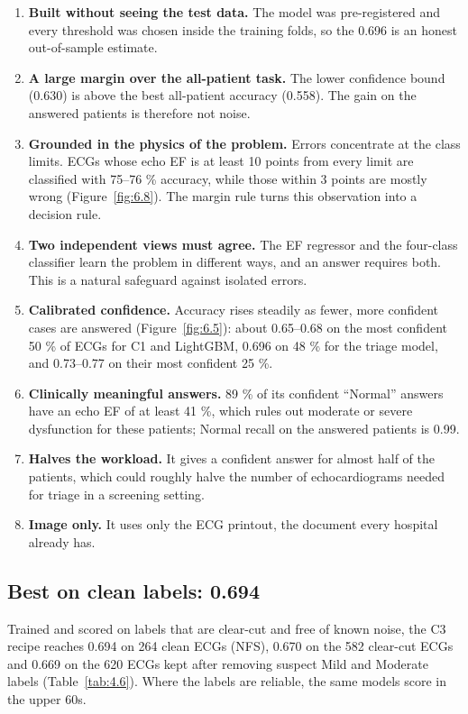 \begin{enumerate}
  \item \textbf{Built without seeing the test data.} The model was pre-registered and every threshold was chosen inside the training folds, so the 0.696 is an honest out-of-sample estimate.
  \item \textbf{A large margin over the all-patient task.} The lower confidence bound (0.630) is above the best all-patient accuracy (0.558). The gain on the answered patients is therefore not noise.
  \item \textbf{Grounded in the physics of the problem.} Errors concentrate at the class limits. ECGs whose echo EF is at least 10 points from every limit are classified with 75--76 \% accuracy, while those within 3 points are mostly wrong (Figure~\ref{fig:6.8}). The margin rule turns this observation into a decision rule.
  \item \textbf{Two independent views must agree.} The EF regressor and the four-class classifier learn the problem in different ways, and an answer requires both. This is a natural safeguard against isolated errors.
  \item \textbf{Calibrated confidence.} Accuracy rises steadily as fewer, more confident cases are answered (Figure~\ref{fig:6.5}): about 0.65--0.68 on the most confident 50 \% of ECGs for C1 and LightGBM, 0.696 on 48 \% for the triage model, and 0.73--0.77 on their most confident 25 \%.
  \item \textbf{Clinically meaningful answers.} 89 \% of its confident ``Normal'' answers have an echo EF of at least 41 \%, which rules out moderate or severe dysfunction for these patients; Normal recall on the answered patients is 0.99.
  \item \textbf{Halves the workload.} It gives a confident answer for almost half of the patients, which could roughly halve the number of echocardiograms needed for triage in a screening setting.
  \item \textbf{Image only.} It uses only the ECG printout, the document every hospital already has.
\end{enumerate}

\subsection{Best on clean labels: 0.694}\label{sec:6.1.4}

Trained and scored on labels that are clear-cut and free of known noise, the C3 recipe reaches 0.694 on 264 clean ECGs (NFS), 0.670 on the 582 clear-cut ECGs and 0.669 on the 620 ECGs kept after removing suspect Mild and Moderate labels (Table~\ref{tab:4.6}). Where the labels are reliable, the same models score in the upper 60s.

